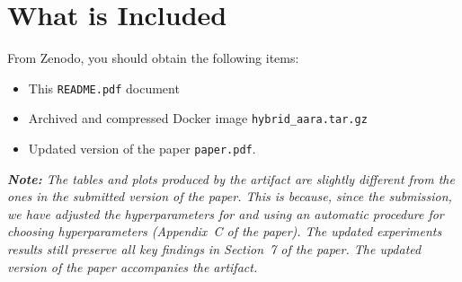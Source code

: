 
\section{What is Included}

From Zenodo, you should obtain the following items:
\begin{itemize}
  \item This \texttt{README.pdf} document
  \item Archived and compressed Docker image \texttt{hybrid\_aara.tar.gz}
  \item Updated version of the paper \texttt{paper.pdf}.
\end{itemize}

\emph{\textbf{Note:} The tables and plots produced by the artifact are slightly
  different from the ones in the submitted version of the paper.
  This is because, since the submission, we have adjusted the hyperparameters
  for \BayesWC{} and \BayesPC{} using an automatic procedure for choosing
  hyperparameters (Appendix~C of the paper).
  The updated experiments results still preserve all key findings in Section~7
  of the paper.
  The updated version of the paper accompanies the artifact.}


